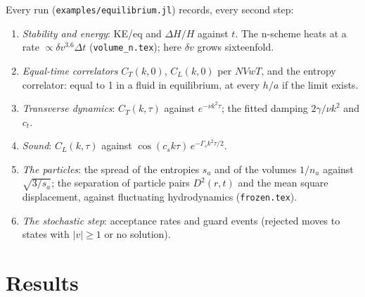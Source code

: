 \documentclass[11pt,aps,preprint,nofootinbib,superscriptaddress,tightenlines]{revtex4-2}
\begin{document}
Every run (\texttt{examples/equilibrium.jl}) records, every second step:
\begin{enumerate}
\item \emph{Stability and energy}: KE/eq and $\Delta H/H$ against $t$.  The n-scheme heats at a
  rate $\propto\delta v^{3.6}\Delta t$ (\texttt{volume\_n.tex}); here $\delta v$ grows sixteenfold.
\item \emph{Equal-time correlators} $C_T(k,0)$, $C_L(k,0)$ per $NVwT$, and the entropy
  correlator: equal to 1 in a fluid in equilibrium, at every $h/a$ if the limit exists.
\item \emph{Transverse dynamics}: $C_T(k,\tau)$ against $e^{-\nu k^2\tau}$; the fitted damping
  $2\gamma/\nu k^2$ and $c_t$.
\item \emph{Sound}: $C_L(k,\tau)$ against $\cos(c_sk\tau)\,e^{-\Gamma_sk^2\tau/2}$.
\item \emph{The particles}: the spread of the entropies $s_a$ and of the volumes $1/n_a$ against
  $\sqrt{3/s_a}$; the separation of particle pairs $D^2(r,t)$ and the mean square
  displacement, against fluctuating hydrodynamics (\texttt{frozen.tex}).
\item \emph{The stochastic step}: acceptance rates and guard events (rejected moves to states
  with $|v|\ge1$ or no solution).
\end{enumerate}

\section{Results}
\label{sec:results}
\end{document}

